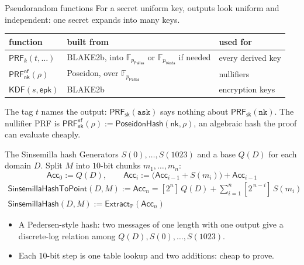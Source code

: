 \documentclass[aspectratio=169,11pt]{beamer}
\newcommand{\F}{\mathbb{F}}
\newcommand{\nksym}{\ensuremath{\mathsf{nk}}}
\newcommand{\epk}{\ensuremath{\mathsf{epk}}}
\newcommand{\Extract}{\ensuremath{\mathsf{Extract}}}
\newcommand{\PP}{\mathbb{P}}
\newcommand{\pP}{p_{\mathsf{Pallas}}}
\newcommand{\pV}{p_{\mathsf{Vesta}}}
\newcommand{\FP}{\F_{\pP}}
\newcommand{\FV}{\F_{\pV}}
\newcommand{\Ext}{\Extract_{\PP}}
\newcommand{\sksym}{\mathsf{sk}}
\newcommand{\PRF}[1]{\mathsf{PRF}_{#1}}
\newcommand{\KDF}{\mathsf{KDF}}
\newcommand{\SinHash}{\mathsf{SinsemillaHash}}
\newcommand{\SinPt}{\mathsf{SinsemillaHashToPoint}}
\begin{document}
\begin{frame}{Pseudorandom functions}
For a secret uniform key, outputs look uniform and independent: one secret
expands into many keys.
\vfill
\begin{center}
\begin{tabular}{@{}lll@{}}
\toprule
function & built from & used for \\
\midrule
$\PRF{k}(t, \dots)$ & BLAKE2b, into $\FP$ or $\FV$ if needed & every derived
  key \\
$\PRF{\nksym}^{\mathsf{nf}}(\rho)$ & Poseidon, over $\FP$ & nullifiers \\
$\KDF(s, \epk)$ & BLAKE2b & encryption keys \\
\bottomrule
\end{tabular}
\end{center}
\vfill
The tag $t$ names the output: $\PRF{\sksym}(\mathtt{ask})$ says nothing about
$\PRF{\sksym}(\mathtt{nk})$. The nullifier PRF is
$\PRF{\nksym}^{\mathsf{nf}}(\rho) := \mathsf{PoseidonHash}(\nksym, \rho)$, an
algebraic hash the proof can evaluate cheaply.
\end{frame}

\begin{frame}{The Sinsemilla hash}
Generators $S(0), \dots, S(1023)$ and a base $Q(D)$ for each domain $D$.
Split $M$ into $10$-bit chunks $m_1, \dots, m_n$:
\[
\mathsf{Acc}_0 := Q(D), \qquad
\mathsf{Acc}_i := \bigl(\mathsf{Acc}_{i-1} + S(m_i)\bigr) + \mathsf{Acc}_{i-1}
\]
\begin{gather*}
\SinPt(D, M) := \mathsf{Acc}_n = [2^n]\,Q(D)
  + \sum_{i=1}^{n} [2^{\,n-i}]\,S(m_i) \\
\SinHash(D, M) := \Ext(\mathsf{Acc}_n)
\end{gather*}
\vfill
\begin{itemize}\itemsep5pt
\item A Pedersen-style hash: two messages of one length with one output give
  a discrete-log relation among $Q(D), S(0), \dots, S(1023)$.
\item Each $10$-bit step is one table lookup and two additions: cheap to
  prove.
\end{itemize}
\end{frame}
\end{document}
